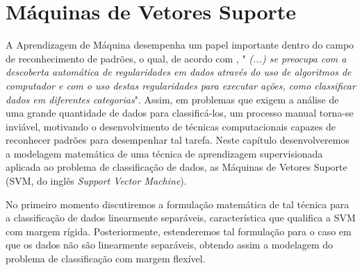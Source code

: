 \documentclass[12pt,a4paper]{scrartcl}
\def\RR{\mathds{R}}
\newtheorem{prop}{Proposição}
\theoremstyle{definition}%
\begin{document}



\newpage
\section{Máquinas de Vetores Suporte} \label{chap:maquinas_vetores_suporte}

A Aprendizagem de Máquina desempenha um papel importante dentro do campo de reconhecimento de padrões, o qual, de acordo com \textcite{bishop2016pattern}, "\textit{ (...) se preocupa com a descoberta automática de regularidades em dados através do uso de algoritmos de computador e com o uso destas regularidades para executar ações, como classificar dados em diferentes categorias}". Assim, em problemas que exigem a análise de uma grande quantidade de dados para classificá-los, um processo manual torna-se inviável, motivando o desenvolvimento de técnicas computacionais capazes de reconhecer padrões para desempenhar tal tarefa. Neste capítulo desenvolveremos a modelagem matemática de uma técnica de aprendizagem supervisionada aplicada ao problema de classificação de dados, as Máquinas de Vetores Suporte (SVM, do inglês \textit{Support Vector Machine}). 

No primeiro momento discutiremos a formulação matemática de tal técnica para a classificação de dados linearmente separáveis, característica que qualifica a SVM com margem rígida. Posteriormente, estenderemos tal formulação para o caso em que os dados não são linearmente separáveis, obtendo assim a modelagem do problema de classificação com margem flexível.
\end{document}
